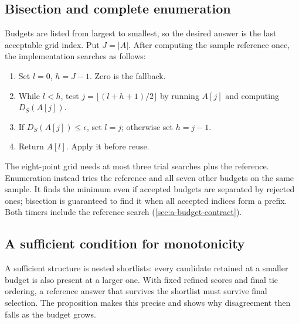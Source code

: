 \subsection{Bisection and complete enumeration}

Budgets are listed from largest to smallest, so the desired answer is
the last acceptable grid index. Put $J=|A|$. After computing the sample
reference once, the implementation searches as follows:
\par\noindent\begin{minipage}{\linewidth}
\begin{enumerate}[leftmargin=*,itemsep=0.15em]
\item Set $l=0$, $h=J-1$. Zero is the fallback.
\item While $l<h$, test $j=\lfloor(l+h+1)/2\rfloor$ by running
$A[j]$ and computing $D_S(A[j])$.
\item If $D_S(A[j])\leq\epsilon$, set $l=j$; otherwise set $h=j-1$.
\item Return $A[l]$. Apply it before reuse.
\end{enumerate}
\end{minipage}\par\medskip
The eight-point grid needs at most three trial searches plus the
reference. Enumeration instead tries the reference and all seven other
budgets on the same sample. It finds the minimum even if accepted
budgets are separated by rejected ones; bisection is guaranteed to find it when
all accepted indices form a prefix. Both timers include the reference
search (\cref{sec:a-budget-contract}).

\subsection{A sufficient condition for monotonicity}

A sufficient structure is nested shortlists: every candidate retained at
a smaller budget is also present at a larger one. With fixed refined
scores and final tie ordering, a reference answer that survives the
shortlist must survive final selection. The proposition makes this
precise and shows why disagreement then falls as the budget grows.

